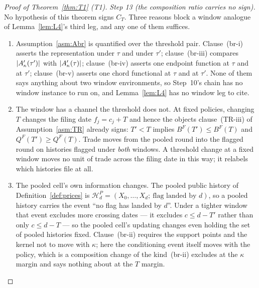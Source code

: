 \begin{proof}[Proof of Theorem~\ref{thm:T1} (T1)]
\emph{Step 13 (the composition ratio carries no sign).} No hypothesis of this theorem signs $C_T$.
Three reasons block a window analogue of Lemma~\ref{lem:L4}'s third leg, and any one of them
suffices.
\begin{enumerate}[label=(\roman*),leftmargin=2.4em,itemsep=3pt]
\item Assumption~\ref{asm:Abr} is quantified over the threshold pair. Clause~(br-i) asserts the
  representation under $\tau$ and under $\tau'$; clause~(br-iii) compares $\lvert A'_{\kappa}(\tau')\rvert$
  with $\lvert A'_{\kappa}(\tau)\rvert$; clause~(br-iv) asserts one endpoint function at $\tau$ and at
  $\tau'$; clause~(br-v) asserts one chord functional at $\tau$ and at $\tau'$. None of them says
  anything about two window environments, so Step~10's chain has no window instance to run on, and
  Lemma~\ref{lem:L4} has no window leg to cite.
\item The window has a channel the threshold does not. At fixed policies, changing $T$ changes the
  filing date $f_j = c_j + T$ and hence the objects clause~(TR-iii) of Assumption~\ref{asm:TR}
  already signs: $T' < T$ implies $B^F(T') \le B^F(T)$ and $Q^F(T') \ge Q^F(T)$. Trade moves from
  the pooled round into the flagged round on histories flagged under \emph{both} windows. A
  threshold change at a fixed window moves no unit of trade across the filing date in this way; it
  relabels which histories file at all.
\item The pooled cell's own information changes. The pooled public history of
  Definition~\ref{def:prices} is $\mathcal H_d^P = (X_0,\dots,X_d;\ \text{flag landed by }d)$, so a
  pooled history carries the event ``no flag has landed by $d$''. Under a tighter window that event
  excludes more crossing dates --- it excludes $c \le d - T'$ rather than only $c \le d - T$ --- so
  the pooled cell's updating changes even holding the set of pooled histories fixed. Clause~(br-ii)
  requires the support points and the kernel not to move with $\kappa$; here the conditioning event
  itself moves with the policy, which is a composition change of the kind~(br-ii) excludes at the
  $\kappa$ margin and says nothing about at the $T$ margin.
\end{enumerate}


\end{proof}
